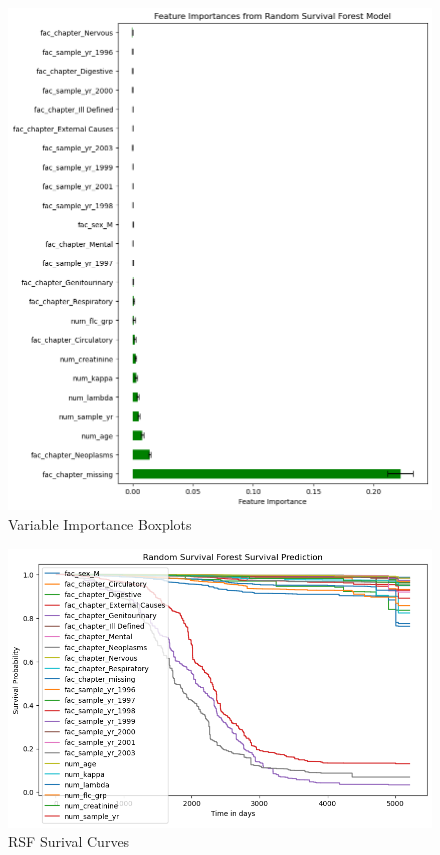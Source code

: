 \clearpage
\begin{figure}[h]
    \centering
    \includegraphics[width=\linewidth]{Figures/SURV/rsf_imp.png}
    \caption{Variable Importance Boxplots}
    \label{fig:var_imp}
\end{figure}



\clearpage

\begin{figure}[h]
    \centering
    \includegraphics[scale=0.50]{Figures/SURV/rsf_survival.png}
    \caption{RSF Surival Curves}
    \label{fig:rsf_surv}
\end{figure}

